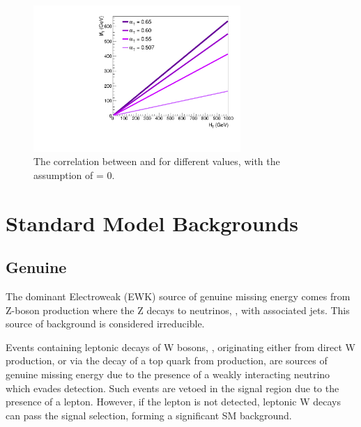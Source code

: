 \begin{figure}
  \centering
  \includegraphics[width=0.7\textwidth]{Figs/alphat/mht_correlation.pdf}
  \caption{The correlation between \HT and \mht for different \alphat values,
  with the assumption of \deltaHT = 0.}
  \label{fig:alphat_mht_corr}
\end{figure}


\section{Standard Model Backgrounds}
\subsection{Genuine \met}
The dominant Electroweak (EWK) source of genuine missing energy comes from
Z-boson production where the Z decays
to neutrinos, \zinv, with associated jets. This source of background
is considered irreducible.

Events containing leptonic decays of W bosons, \wlnu, originating either
from direct W production, or via the decay of a top quark from \ttbar 
production, are sources of genuine 
missing energy due to the presence of a weakly interacting neutrino which
evades detection. Such events are vetoed in the signal
region due to the presence of a 
lepton. However, if the lepton is not detected, leptonic W decays 
can pass the signal selection, forming a significant SM background.


